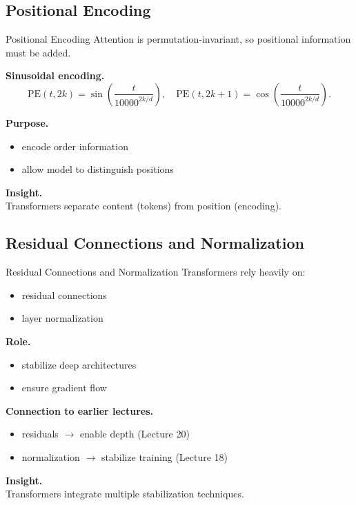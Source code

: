 \documentclass[aspectratio=169,11pt]{beamer}
\begin{document}
\subsection{Positional Encoding}
\begin{frame}[t,allowframebreaks]{Positional Encoding}
\small
Attention is permutation-invariant, so positional information must be added.

\textbf{Sinusoidal encoding.}\\ \[
\text{PE}(t, 2k) = \sin\left(\frac{t}{10000^{2k/d}}\right), \quad
\text{PE}(t, 2k+1) = \cos\left(\frac{t}{10000^{2k/d}}\right).
\]

\textbf{Purpose.}\\ \begin{itemize}
    \item encode order information
    \item allow model to distinguish positions
\end{itemize}

\textbf{Insight.}\\ Transformers separate content (tokens) from position (encoding).
\end{frame}

\subsection{Residual Connections and Normalization}
\begin{frame}[t,allowframebreaks]{Residual Connections and Normalization}
\small
Transformers rely heavily on:

\begin{itemize}
    \item residual connections
    \item layer normalization
\end{itemize}

\textbf{Role.}\\ \begin{itemize}
    \item stabilize deep architectures
    \item ensure gradient flow
\end{itemize}

\textbf{Connection to earlier lectures.}\\ \begin{itemize}
    \item residuals $\rightarrow$ enable depth (Lecture 20)
    \item normalization $\rightarrow$ stabilize training (Lecture 18)
\end{itemize}

\textbf{Insight.}\\ Transformers integrate multiple stabilization techniques.
\end{frame}
\end{document}
